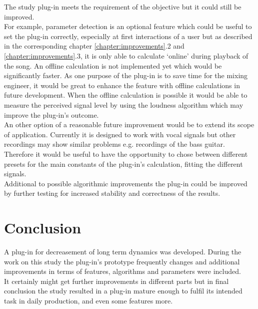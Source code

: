The study plug-in meets the requirement of the objective but it could still be improved.\\
For example, parameter detection is an optional feature which could be useful to set the plug-in correctly, especially at first interactions of a user but as described in the corresponding chapter \ref{chapter:improvements}.2 and \ref{chapter:improvements}.3, it is only able to calculate ‘online’ during playback of the song. An offline calculation is not implemented yet which would be significantly faster. As one purpose of the plug-in is to save time for the mixing engineer, it would be great to enhance the feature with offline calculations in future development. When the offline calculation is possible it would be able to measure the perceived signal level by using the loudness algorithm\cite{ITUalgo} which may improve the plug-in’s outcome.\\
An other option of a reasonable future improvement would be to extend its scope of application. Currently it is designed to work with vocal signals but other recordings may show similar problems e.g. recordings of the bass guitar. Therefore it would be useful to have the opportunity to chose between different presets for the main constants of the plug-in’s calculation, fitting the different signals.\\
Additional to possible algorithmic improvements the plug-in could be improved by further testing for increased stability and correctness of the results.\\

\section{Conclusion}

A plug-in for decreasement of long term dynamics was developed. During the work on this study the plug-in’s prototype frequently changes and additional improvements in terms of features, algorithms and parameters were included.\\
It certainly might get further improvements in different parts but in final conclusion the study resulted in a plug-in mature enough to fulfil its intended task in daily production, and even some features more.\\




